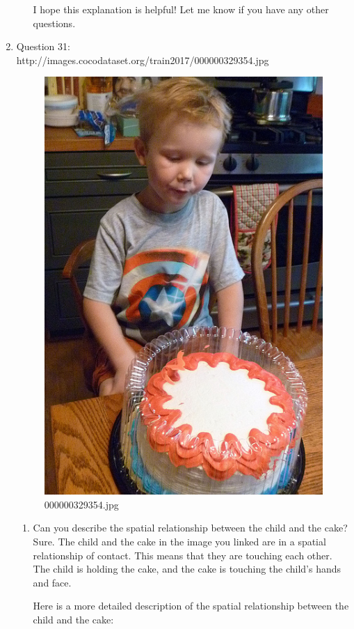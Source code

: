 \begin{enumerate}
\begin{enumerate}
        I hope this explanation is helpful! Let me know if you have any other questions.
    \end{enumerate}
    \item Question 31:\\http://images.cocodataset.org/train2017/000000329354.jpg
    \begin{figure}[h]
        \centering
        \includegraphics[width=0.8\linewidth]{../image set/easy/000000329354.jpg}
        \caption{000000329354.jpg}
    \end{figure}
    \begin{enumerate}
        \item Can you describe the spatial relationship between the child and the cake?
        \subitem Sure. The child and the cake in the image you linked are in a spatial relationship of contact. This means that they are touching each other. The child is holding the cake, and the cake is touching the child's hands and face.

        Here is a more detailed description of the spatial relationship between the child and the cake:
        

\end{enumerate}
\end{enumerate}
